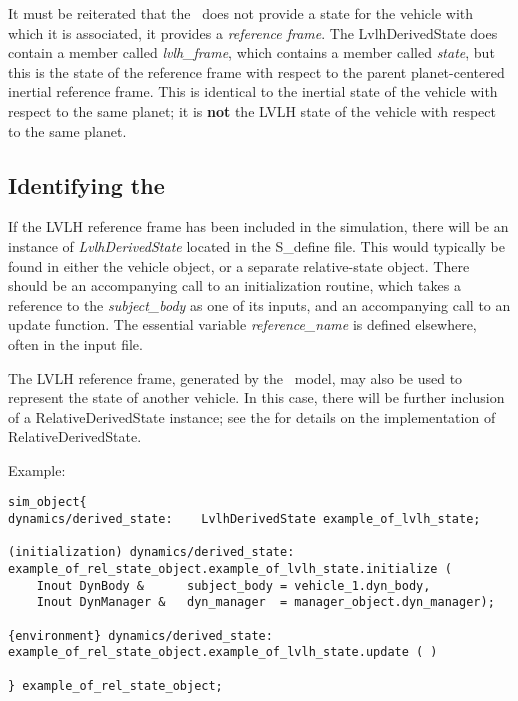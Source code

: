 %
%
% 
%

\label{sec:lvlhuseranalysis}

It must be reiterated that the \LVLHDesc\ does not provide a state for the vehicle with which it is associated, it provides a \textit{reference frame}.  The LvlhDerivedState does contain a member called \textit{lvlh\_frame}, which contains a member called \textit{state}, but this is the state of the reference frame with respect to the parent planet-centered inertial reference frame.  This is identical to the inertial state of the vehicle with respect to the same planet; it is \textbf{not} the LVLH state of the vehicle with respect to the same planet. 

\subsection{Identifying the \LVLHDesc}
If the LVLH reference frame has been included in the simulation, there will be an instance of \textit{LvlhDerivedState} located in the S\_define file.  This would typically be found in either the vehicle object, or a separate relative-state object.  There should be an accompanying call to an initialization routine, which takes a reference to the \textit{subject\_body} as one of its inputs, and an accompanying call to an update function.  The essential variable \textit{reference\_name} is defined elsewhere, often in the input file.

The LVLH reference frame, generated by the \LVLHDesc\ model, may also be used to represent the state of another vehicle.  In this case, there will be further inclusion of a RelativeDerivedState instance; see the  for details on the implementation of RelativeDerivedState.

Example:
\begin{verbatim}
sim_object{
dynamics/derived_state:    LvlhDerivedState example_of_lvlh_state;

(initialization) dynamics/derived_state:
example_of_rel_state_object.example_of_lvlh_state.initialize (
    Inout DynBody &      subject_body = vehicle_1.dyn_body,
    Inout DynManager &   dyn_manager  = manager_object.dyn_manager);
    
{environment} dynamics/derived_state:
example_of_rel_state_object.example_of_lvlh_state.update ( )

} example_of_rel_state_object;
\end{verbatim}

